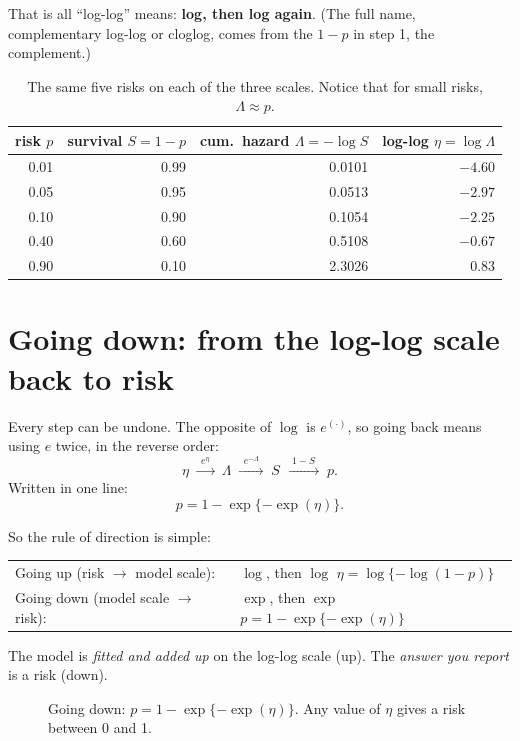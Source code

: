 \documentclass[11pt]{article}
\newcommand{\up}{\textcolor{blue!70!black}}
\newcommand{\down}{\textcolor{red!70!black}}
\begin{document}
That is all ``log-log'' means: \textbf{log, then log again}. (The full name, complementary
log-log or cloglog, comes from the $1-p$ in step 1, the complement.)

\begin{table}[h]
\centering
\begin{tabular}{rrrr}
\toprule
risk $p$ & survival $S = 1-p$ & cum.\ hazard $\Lambda = -\log S$ & log-log $\eta = \log\Lambda$ \\
\midrule
0.01 & 0.99 & 0.0101 & $-4.60$ \\
0.05 & 0.95 & 0.0513 & $-2.97$ \\
0.10 & 0.90 & 0.1054 & $-2.25$ \\
0.40 & 0.60 & 0.5108 & $-0.67$ \\
0.90 & 0.10 & 2.3026 & $0.83$ \\
\bottomrule
\end{tabular}
\caption{The same five risks on each of the three scales. Notice that for small risks,
$\Lambda \approx p$.}
\end{table}

\section{Going down: from the log-log scale back to risk}

Every step can be undone. The opposite of $\log$ is $e^{(\cdot)}$, so going back means
using $e$ twice, in the reverse order:
\[
  \eta
  \;\xrightarrow{\ \ e^{\eta}\ \ }\;
  \Lambda
  \;\xrightarrow{\ \ e^{-\Lambda}\ \ }\;
  S
  \;\xrightarrow{\ \ 1 - S\ \ }\;
  p .
\]
Written in one line:
\[
  p = 1 - \exp\{-\exp(\eta)\}.
\]

So the rule of direction is simple:
\begin{center}
\begin{tabular}{ll}
\up{Going up} (risk $\to$ model scale): & $\log$, then $\log$ \quad $\eta = \log\{-\log(1-p)\}$ \\[3pt]
\down{Going down} (model scale $\to$ risk): & $\exp$, then $\exp$ \quad $p = 1-\exp\{-\exp(\eta)\}$
\end{tabular}
\end{center}
The model is \emph{fitted and added up} on the log-log scale (up). The \emph{answer you report}
is a risk (down).

\begin{figure}[h]
\centering
{}
\caption{Going down: $p = 1-\exp\{-\exp(\eta)\}$. Any value of $\eta$ gives a risk between 0
and 1.}
\end{figure}
\end{document}
